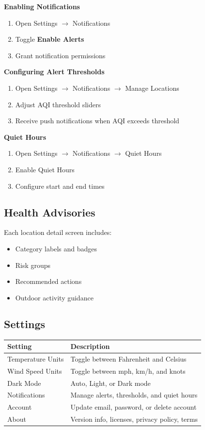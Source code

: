 \documentclass[11pt]{article}
\begin{document}
\textbf{Enabling Notifications}

\begin{enumerate}
    \item Open Settings $\rightarrow$ Notifications
    \item Toggle \textbf{Enable Alerts}
    \item Grant notification permissions
\end{enumerate}

\textbf{Configuring Alert Thresholds}

\begin{enumerate}
    \item Open Settings $\rightarrow$ Notifications $\rightarrow$ Manage Locations
    \item Adjust AQI threshold sliders
    \item Receive push notifications when AQI exceeds threshold
\end{enumerate}

\textbf{Quiet Hours}

\begin{enumerate}
    \item Open Settings $\rightarrow$ Notifications $\rightarrow$ Quiet Hours
    \item Enable Quiet Hours
    \item Configure start and end times
\end{enumerate}

\subsection{Health Advisories}

Each location detail screen includes:

\begin{itemize}
    \item Category labels and badges
    \item Risk groups
    \item Recommended actions
    \item Outdoor activity guidance
\end{itemize}

\subsection{Settings}

\begin{longtable}{|p{}|p{}|}
\hline
\textbf{Setting} & \textbf{Description} \\
\hline
Temperature Units & Toggle between Fahrenheit and Celsius \\
\hline
Wind Speed Units & Toggle between mph, km/h, and knots \\
\hline
Dark Mode & Auto, Light, or Dark mode \\
\hline
Notifications & Manage alerts, thresholds, and quiet hours \\
\hline
Account & Update email, password, or delete account \\
\hline
About & Version info, licenses, privacy policy, terms \\
\hline
\end{longtable}
\newpage
\end{document}
